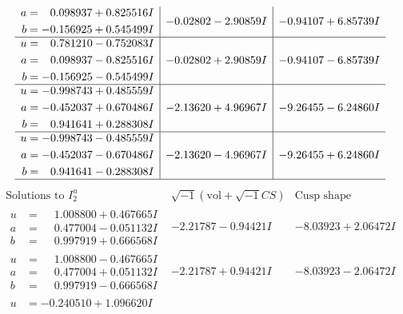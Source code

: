 \documentclass[1p]{elsarticle_modified}
\theoremstyle{definition}
\newcommand{\I}{\sqrt{-1}}
\begin{document}
$$\begin{array}{c|c|c}
\begin{aligned}
a &= \phantom{-}0.098937 + 0.825516 I \\
b &= -0.156925 + 0.545499 I\end{aligned}
 & -0.02802 - 2.90859 I & -0.94107 + 6.85739 I \\ \hline\begin{aligned}
u &= \phantom{-}0.781210 - 0.752083 I \\
a &= \phantom{-}0.098937 - 0.825516 I \\
b &= -0.156925 - 0.545499 I\end{aligned}
 & -0.02802 + 2.90859 I & -0.94107 - 6.85739 I \\ \hline\begin{aligned}
u &= -0.998743 + 0.485559 I \\
a &= -0.452037 + 0.670486 I \\
b &= \phantom{-}0.941641 + 0.288308 I\end{aligned}
 & -2.13620 + 4.96967 I & -9.26455 - 6.24860 I \\ \hline\begin{aligned}
u &= -0.998743 - 0.485559 I \\
a &= -0.452037 - 0.670486 I \\
b &= \phantom{-}0.941641 - 0.288308 I\end{aligned}
 & -2.13620 - 4.96967 I & -9.26455 + 6.24860 I\\
 \hline 
 \end{array}$$\newpage$$\begin{array}{c|c|c}  
\text{Solutions to }I^u_{2}& \I (\text{vol} + \sqrt{-1}CS) & \text{Cusp shape}\\
 \hline 
\begin{aligned}
u &= \phantom{-}1.008800 + 0.467665 I \\
a &= \phantom{-}0.477004 - 0.051132 I \\
b &= \phantom{-}0.997919 + 0.666568 I\end{aligned}
 & -2.21787 - 0.94421 I & -8.03923 + 2.06472 I \\ \hline\begin{aligned}
u &= \phantom{-}1.008800 - 0.467665 I \\
a &= \phantom{-}0.477004 + 0.051132 I \\
b &= \phantom{-}0.997919 - 0.666568 I\end{aligned}
 & -2.21787 + 0.94421 I & -8.03923 - 2.06472 I \\ \hline\begin{aligned}
u &= -0.240510 + 1.096620 I \\

\end{aligned}
\end{array}$$
\end{document}
